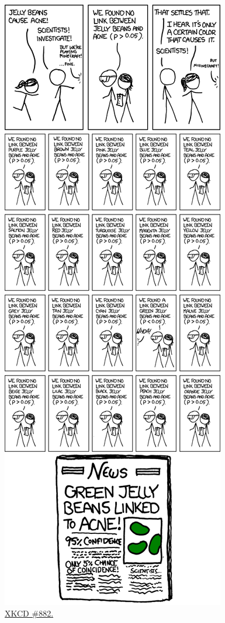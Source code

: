 \documentclass[12pt,oneside,openany]{book}
\begin{document}
\begin{figure}
\centering
\includegraphics{significant.png}
\caption{\href{https://xkcd.com/882/}{XKCD \#882.}}
\end{figure}
\end{document}
